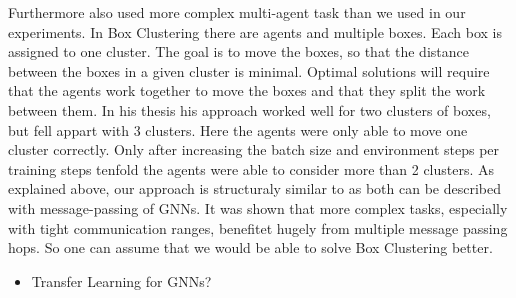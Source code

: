 Furthermore \citet{RobinRuede2021} also used more complex multi-agent task than we used in our experiments. In Box Clustering there are agents and multiple boxes. Each box is assigned to one cluster. The goal is to move the boxes, so that the distance between the boxes in a given cluster is minimal. Optimal solutions will require that the agents work together to move the boxes and that they split the work between them. In his thesis his approach worked well for two clusters of boxes, but fell appart with 3 clusters. Here the agents were only able to move one cluster correctly. Only after increasing the batch size and environment steps per training steps tenfold the agents were able to consider more than 2 clusters. As explained above, our approach is structuraly similar to \citet{RobinRuede2021} as both can be described with message-passing of GNNs. It was shown that more complex tasks, especially with tight communication ranges, benefitet hugely from multiple message passing hops. So one can assume that we would be able to solve Box Clustering better.\par



\begin{itemize}[noitemsep,nolistsep]
	\item Transfer Learning for GNNs?
\end{itemize}
